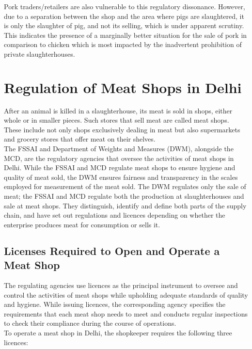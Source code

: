 \documentclass[a4paper, 12pt]{article}
\begin{document}
Pork traders/retailers are also vulnerable to this regulatory dissonance. However, due to a separation between the shop and the area where pigs are slaughtered, it is only the slaughter of pig, and not its selling, which is under apparent scrutiny. This indicates the presence of a marginally better situation for the sale of pork in comparison to chicken which is most impacted by the inadvertent prohibition of private slaughterhouses. 

\section{Regulation of Meat Shops in Delhi}

After an animal is killed in a slaughterhouse, its meat is sold in shops, either whole or in smaller pieces. Such stores that sell meat are called meat shops. These include not only shops exclusively dealing in meat but also supermarkets and grocery stores that offer meat on their shelves.\\

The FSSAI and Department of Weights and Measures (DWM), alongside the MCD, are the regulatory agencies that oversee the activities of meat shops in Delhi. While the FSSAI and MCD regulate meat shops to ensure hygiene and quality of meat sold, the DWM ensures fairness and transparency in the scales employed for measurement of the meat sold. The DWM regulates only the sale of meat; the FSSAI and MCD regulate both the production at slaughterhouses and sale at meat shops. They distinguish, identify and define both parts of the supply chain, and have set out regulations and licences depending on whether the enterprise produces meat for consumption or sells it. \\

\subsection{Licenses Required to Open and Operate a Meat Shop}

The regulating agencies use licences as the principal instrument to oversee and control the activities of meat shops while upholding adequate standards of quality and hygiene. While issuing licences, the corresponding agency specifies the requirements that each meat shop needs to meet and conducts regular inspections to check their compliance during the course of operations. \\

To operate a meat shop in Delhi, the shopkeeper requires the following three licences:\\
\end{document}
